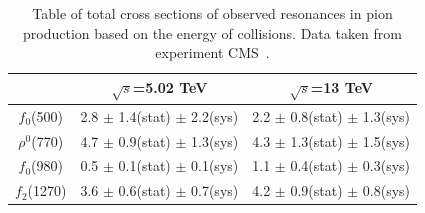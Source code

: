 \begin{table}[ht]
    \centering
    \begin{tabular}{c|c|c}
        \
               & $\sqrt{s}$=5.02 TeV & $\sqrt{s}$=13 TeV \\ \hline
    $f_0$(500) & 2.8 $\pm$ 1.4(stat) $\pm$ 2.2(sys) & 2.2 $\pm$ 0.8(stat) $\pm$ 1.3(sys) \\
    $\rho^0$(770) & 4.7 $\pm$ 0.9(stat) $\pm$ 1.3(sys) & 4.3 $\pm$ 1.3(stat) $\pm$ 1.5(sys) \\
    $f_0$(980) & 0.5 $\pm$ 0.1(stat) $\pm$ 0.1(sys) & 1.1 $\pm$ 0.4(stat) $\pm$ 0.3(sys) \\
    $f_2$(1270) & 3.6 $\pm$ 0.6(stat) $\pm$ 0.7(sys) & 4.2 $\pm$ 0.9(stat) $\pm$ 0.8(sys) 
    \end{tabular}
    \caption[Results of measured cross sections for 4 resonant channels at CMS]{Table of total cross sections of observed resonances in pion production based on the energy of collisions. Data taken from experiment CMS~\cite{Sirunyan_2020}.}
    \label{tt1}
\end{table}
\FloatBarrier
